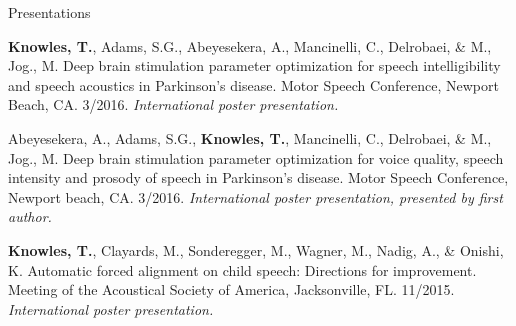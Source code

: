 \documentclass{resume} %
\begin{document}
\begin{rSection}{Presentations}
\begin{etaremune}
	
\item {\bf Knowles, T.}, Adams, S.G., Abeyesekera, A., Mancinelli, C., Delrobaei, \& M., Jog., M. Deep brain stimulation parameter optimization for speech intelligibility and speech acoustics in Parkinson's disease. Motor Speech Conference, Newport Beach, CA. 3/2016. \emph{International poster presentation.}
	
\item Abeyesekera, A., Adams, S.G., {\bf Knowles, T.}, Mancinelli, C., Delrobaei, \& M., Jog., M. Deep brain stimulation parameter optimization for voice quality, speech intensity and prosody of speech in Parkinson's disease. Motor Speech Conference, Newport beach, CA. 3/2016. \emph{International poster presentation, presented by first author.}
	
	
\item {\bf Knowles, T.}, Clayards, M., Sonderegger, M., Wagner, M., Nadig, A., \& Onishi, K. Automatic forced alignment on child speech: Directions for improvement. Meeting of the Acoustical Society of America, Jacksonville, FL. 11/2015. \emph{International poster presentation.}
	

\end{etaremune}
\end{rSection}
\end{document}
